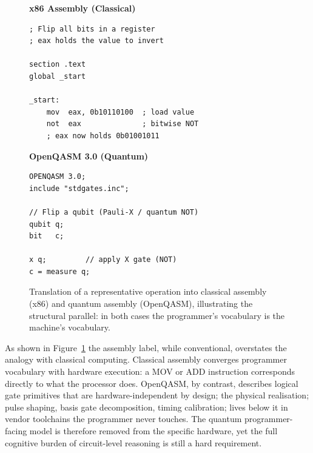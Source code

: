 \begin{figure}[htbp]
    \centering
    \begin{minipage}[t]{0.48\textwidth}
        \centering
        \textbf{x86 Assembly (Classical)}
        \begin{lstlisting}[basicstyle=\ttfamily\scriptsize,
            frame=single,
            label={lst:lit_rev:qpl:assembly_comparison_x86}]
; Flip all bits in a register
; eax holds the value to invert

section .text
global _start

_start:
    mov  eax, 0b10110100  ; load value
    not  eax              ; bitwise NOT
    ; eax now holds 0b01001011
        \end{lstlisting}
    \end{minipage}
    \hfill
    \begin{minipage}[t]{0.46\textwidth}
        \centering
        \textbf{OpenQASM 3.0 (Quantum)}
        \begin{lstlisting}[basicstyle=\ttfamily\scriptsize,
            frame=single,
            label={lst:lit_rev:qpl:assembly_comparison_openqasm}]
OPENQASM 3.0;
include "stdgates.inc";

// Flip a qubit (Pauli-X / quantum NOT)
qubit q;
bit   c;

x q;         // apply X gate (NOT)
c = measure q;
        \end{lstlisting}
    \end{minipage}
    \caption{Translation of a representative operation into classical assembly (x86)
        and quantum assembly (OpenQASM), illustrating the structural parallel: in both
        cases the programmer's vocabulary is the machine's vocabulary.}
    \label{fig:lit_rev:qpl:assembly_comparison}
\end{figure}

As shown in Figure~\ref{fig:lit_rev:qpl:assembly_comparison} the assembly label, while conventional, overstates the analogy with classical computing.
Classical assembly converges programmer vocabulary with hardware execution: a MOV or ADD instruction corresponds directly to what the processor does.
OpenQASM, by contrast, describes logical gate primitives that are hardware-independent by design; the physical realisation; pulse shaping, basis gate decomposition, timing calibration; lives below it in vendor toolchains the programmer never touches.
The quantum programmer-facing model is therefore removed from the specific hardware, yet the full cognitive burden of circuit-level reasoning is still a hard requirement.

